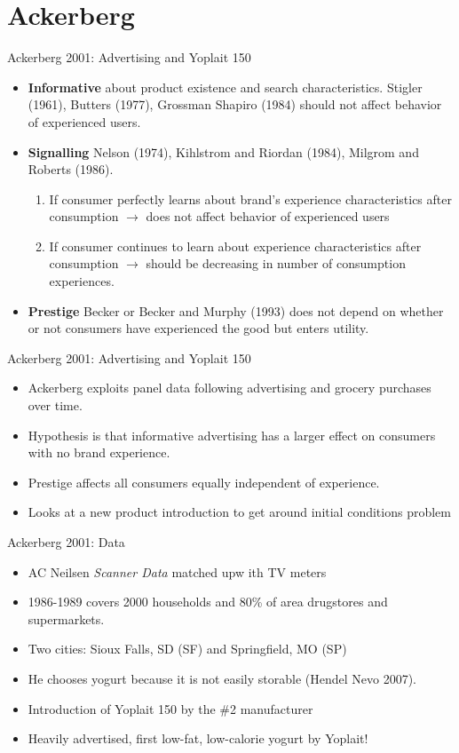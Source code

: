 \section*{Ackerberg}
\begin{frame}{Ackerberg 2001: Advertising and Yoplait 150}
\begin{itemize}
\item \textbf{Informative} about product existence and search characteristics. Stigler (1961), Butters (1977), Grossman Shapiro (1984) should not affect behavior of experienced users.
\item \textbf{Signalling} Nelson (1974), Kihlstrom and Riordan (1984), Milgrom and Roberts (1986).
\begin{enumerate}
\item If consumer perfectly learns about brand's experience characteristics after consumption $\rightarrow$ does not affect behavior of experienced users
\item If consumer continues to learn about  experience characteristics after consumption $\rightarrow$ should be decreasing in number of consumption experiences.
\end{enumerate}
\item \textbf{Prestige} Becker or Becker and Murphy (1993) does not depend on whether or not consumers have experienced the good but enters utility.
\end{itemize}
\end{frame}

\begin{frame}{Ackerberg 2001: Advertising and Yoplait 150}
\begin{itemize}
\item Ackerberg exploits panel data following advertising and grocery purchases over time.
\item Hypothesis is that \alert{informative} advertising has a larger effect on consumers with no brand experience.
\item \alert{Prestige} affects all consumers equally independent of experience.
\item Looks at a new product introduction to get around \alert{initial conditions problem}
\end{itemize}
\end{frame}

\begin{frame}{Ackerberg 2001: Data}
\begin{itemize}
\item AC Neilsen \textit{Scanner Data} matched upw ith TV meters
\item 1986-1989 covers 2000 households and 80\% of area drugstores and supermarkets.
\item Two cities: Sioux Falls, SD \alert{(SF)} and Springfield, MO \alert{(SP)}
\item He chooses yogurt because it is not easily storable (Hendel Nevo 2007).
\item Introduction of \alert{Yoplait 150} by the \#2 manufacturer
\item Heavily advertised, first low-fat, low-calorie yogurt by Yoplait!
\end{itemize}
\end{frame}

